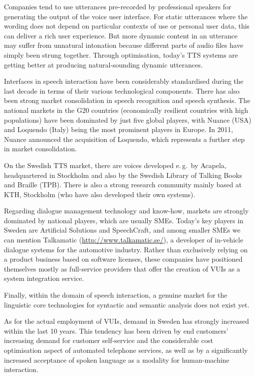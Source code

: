 \begin{multicols}{2}
Companies tend to use utterances pre-recorded by professional speakers
for generating the output of the voice user interface. For static
utterances where the wording does not depend on particular contexts of
use or personal user data, this can deliver a rich user
experience. But more dynamic content in an utterance may suffer from
unnatural intonation because different parts of audio files have simply been strung together. Through optimisation, today’s TTS systems are getting better at producing natural-sounding dynamic utterances.


Interfaces in speech interaction have been considerably standardised during the last decade in terms of their various technological components. There has also been strong market consolidation in speech recognition and speech synthesis. The national markets in the G20 countries (economically resilient countries with high populations) have been dominated by just five global players, with Nuance (USA) and Loquendo (Italy) being the most prominent players in Europe. In 2011, Nuance announced the acquisition of Loquendo, which represents a further step in market consolidation.

On the Swedish TTS market, there are voices developed e.\,g.~by Acapela, headquartered in Stockholm and also by the Swedish Library of Talking Books and Braille (TPB). There is also a strong research community mainly based at KTH, Stockholm (who have also developed their own systems).

Regarding dialogue management technology and know-how, markets are
strongly dominated by national players, which are usually
SMEs. Today’s key players in Sweden are Artificial Solutions and
SpeechCraft, and among smaller SMEs we can mention
Talkamatic (\url{http://www.talkamatic.se/}), a developer of
in-vehicle dialogue systems for the automotive industry. Rather than
exclusively relying on a product business based on software licenses,
these companies have positioned themselves mostly as full-service
providers that offer the creation of VUIs as a system integration
service. 

Finally, within the domain of speech interaction, a genuine
market for the linguistic core technologies for syntactic and semantic
analysis does not exist yet.

As for the actual employment of VUIs, demand in Sweden has strongly
increased within the last 10 years. This tendency has been driven by
end customers’ increasing demand for customer self-service and the
considerable cost optimisation aspect of automated telephone services,
as well as by a significantly increased acceptance of spoken language
as a modality for human-machine interaction. 


\end{multicols}
